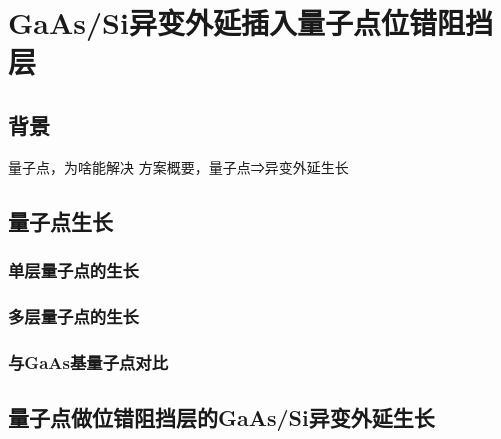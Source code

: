 % 

\chapter{GaAs/Si异变外延插入量子点位错阻挡层}
\section{背景}
量子点，为啥能解决
方案概要，量子点⇒异变外延生长

\section{量子点生长}

\subsection{单层量子点的生长}

\subsection{多层量子点的生长}

\subsection{与GaAs基量子点对比}

\section{量子点做位错阻挡层的GaAs/Si异变外延生长}


\ifx\usechapbib\empty


\fi

